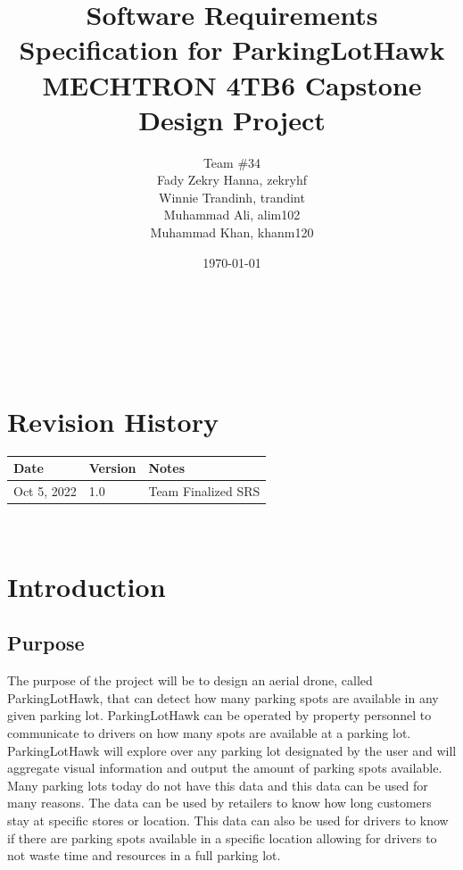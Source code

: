 \documentclass{article}
\begin{document}
\title{
Software Requirements Specification for ParkingLotHawk \\
  \large MECHTRON 4TB6 Capstone Design Project 
    }

\author{\authname Team \#34 \\
Fady Zekry Hanna, zekryhf \\
Winnie Trandinh, trandint \\
Muhammad Ali, alim102 \\
Muhammad Khan, khanm120}

\date{\today}
	
\maketitle

~\newpage


\tableofcontents

~\newpage

\section*{Revision History}

\begin{tabularx}{\textwidth}{p{3cm}p{2cm}X} 
\toprule {\bf Date} & {\bf Version} & {\bf Notes}\\
\midrule
Oct 5, 2022 & 1.0 & Team Finalized SRS\\

\bottomrule
\end{tabularx}

~\newpage


\section{Introduction}
\label{sec:Intro}
\subsection{Purpose}
The purpose of the project will be to design an aerial drone, called ParkingLotHawk, that can detect how many parking spots are available in any given parking lot. ParkingLotHawk can be operated by property personnel to communicate to drivers on how many spots are available at a parking lot. ParkingLotHawk will explore over any parking lot designated by the user and will aggregate visual information and output the amount of parking spots available. Many parking lots today do not have this data and this data can be used for many reasons. The data can be used by retailers to know how long customers stay at specific stores or location. This data can also be used for drivers to know if there are parking spots available in a specific location allowing for drivers to not waste time and resources in a full parking lot. 
\end{document}
